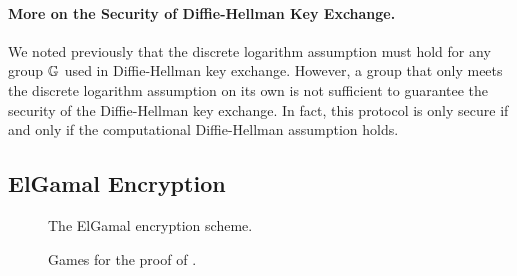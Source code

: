 \paragraph{More on the Security of Diffie-Hellman Key Exchange.} We noted previously that the discrete logarithm assumption must hold for any group $\mathbb{G}$ used in Diffie-Hellman key exchange. However, a group that only meets the discrete logarithm assumption on its own is not sufficient to guarantee the security of the Diffie-Hellman key exchange. In fact, this protocol is only secure if and only if the computational Diffie-Hellman assumption holds.  

\subsection{ElGamal Encryption}

\begin{figure}[H]
	\center
	\caption{The ElGamal encryption scheme.}
	\label{fig:elgamal}
\end{figure}

\begin{wrapfigure}{r}{1.5in}
	\center
	\caption{Games for the proof of .}
	\label{fig:elgamal-games}
\end{wrapfigure}

